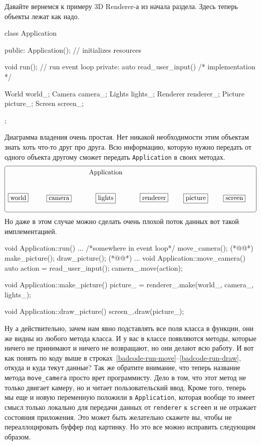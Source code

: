 Давайте вернемся к примеру 3D Renderer-а из начала раздела.
Здесь теперь объекты лежат как надо.
\begin{cppcode}
class Application {
public:
  Application(); // initializes resources
  
  void run(); // run event loop
private:
  auto read_user_input() { /* implementation */ }

  World world_;
  Camera camera_;
  Lights lights_;
  Renderer renderer_;
  Picture picture_;
  Screen screen_;
};
\end{cppcode}
Диаграмма владения очень простая.
Нет никакой необходимости этим объектам знать хоть что-то друг про друга.
Всю информацию, которую нужно передать от одного объекта другому сможет передать \verb"Application" в своих методах.
\[
\xymatrix{
  {\phantom{Aworld}}&{}&{\text{Application}}
    	{
	\save
   [ll].[drrr]*+++[F-:<3pt>]\frm{}
   \restore
	}
  &{}&{}&{}\\
  {\text{world}}
      	{
	\save
   [].[]*[F-]\frm{}
   \restore
	}
  &{\text{camera}}
        	{
	\save
   [].[]*[F-]\frm{}
   \restore
	}
  &{\text{lights}}
        	{
	\save
   [].[]*[F-]\frm{}
   \restore
	}
  &{\text{renderer}}
        	{
	\save
   [].[]*[F-]\frm{}
   \restore
	}
  &{\text{picture}}
        	{
	\save
   [].[]*[F-]\frm{}
   \restore
	}
  &{\text{screen}}
        	{
	\save
   [].[]*[F-]\frm{}
   \restore
	}
  \\
}
\]
Но даже в этом случае можно сделать очень плохой поток данных вот такой имплементацией.
\begin{cppcode}
void Application::run() {
  ...
  /*somewhere in event loop*/
  move_camera(); (*@@*)
  make_picture();
  draw_picture(); (*@@*)
  ...
}
void Application::move_camera() {
  auto action = read_user_input();
  camera_.move(action);
}

void Application::make_picture() {
  picture_ = renderer_.make(world_, camera_, lights_);
}

void Application::draw_picture() {
  screen_.draw(picture_);
}
\end{cppcode}
Ну а действительно, зачем нам явно подставлять все поля класса в функции, они же видны из любого метода класса.
И у вас в классе появляются методы, которые ничего не принимают и ничего не возвращают, но они делают всю работу.
И вот как понять по коду выше в строках~\ref{badcode-run-move}--\ref{badcode-run-draw}, откуда и куда текут данные?
Так же обратите внимание, что теперь название метода \verb"move_camera" просто врет программисту.
Дело в том, что этот метод не только двигает камеру, но и читает пользовательский ввод.
Кроме того, теперь мы еще и новую переменную положили в \verb"Application", которая вообще то имеет смысл только локально для передачи данных от \verb"renderer" к \verb"screen" и не отражает состояния приложения.
Это может быть желательно скажете вы, чтобы не переаллоцировать буффер под картинку.
Но это все можно исправить следующим образом.

